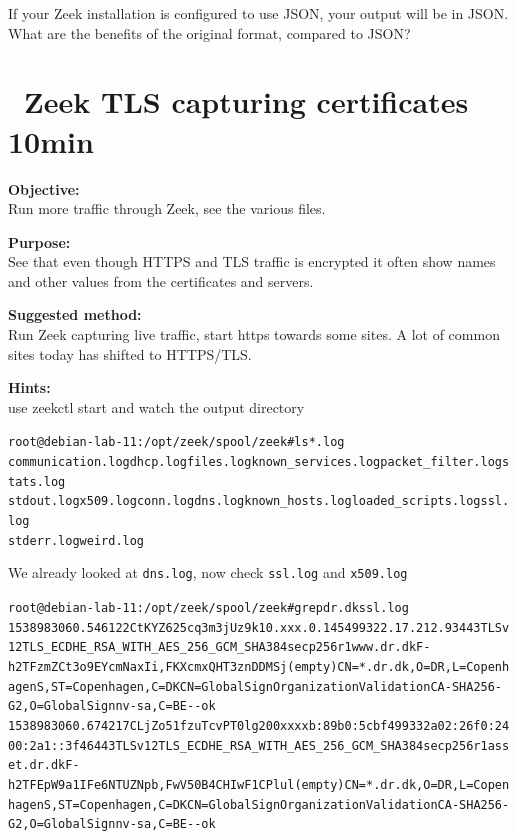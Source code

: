 \documentclass[a4paper,11pt,notitlepage]{report}
\begin{document}
If your Zeek installation is configured to use JSON, your output will be in JSON. What are the benefits of the original format, compared to JSON?

\chapter{\faExclamationTriangle\ Zeek TLS capturing certificates 10min}
\label{ex:zeektlsbasic}


{\bf Objective:} \\
Run more traffic through Zeek, see the various files.


{\bf Purpose:}\\
See that even though HTTPS and TLS traffic is encrypted it often show names and other values from the certificates and servers.


{\bf Suggested method:}\\
Run Zeek capturing live traffic, start https towards some sites. A lot of common sites today has shifted to HTTPS/TLS.


{\bf Hints:}\\
use zeekctl start and watch the output directory

\begin{alltt}\small
root@debian-lab-11:/opt/zeek/spool/zeek# ls *.log
communication.log  dhcp.log files.log known_services.log packet_filter.log  stats.log
stdout.log x509.log conn.log dns.log known_hosts.log loaded_scripts.log  ssl.log
stderr.log weird.log
\end{alltt}

We already looked at \verb+dns.log+, now check \verb+ssl.log+ and \verb+x509.log+

\begin{alltt}\small
root@debian-lab-11:/opt/zeek/spool/zeek# grep dr.dk ssl.log
1538983060.546122	CtKYZ625cq3m3jUz9k	10.xxx.0.145	49932	2.17.212.93	443	TLSv12	TLS_ECDHE_RSA_WITH_AES_256_GCM_SHA384	secp256r1	www.dr.dk	F	-	h2	T	FzmZCt3o9EYcmNaxIi,FKXcmxQHT3znDDMSj	(empty)	CN=*.dr.dk,O=DR,L=Copenhagen S,ST=Copenhagen,C=DK	CN=GlobalSign Organization Validation CA - SHA256 - G2,O=GlobalSign nv-sa,C=BE	-	-	ok
1538983060.674217	CLjZo51fzuTcvPT0lg	200xxxxb:89b0:5cbf	49933	2a02:26f0:2400:2a1::3f46	443	TLSv12	TLS_ECDHE_RSA_WITH_AES_256_GCM_SHA384	secp256r1	asset.dr.dk	F	-	h2	TFEpW9a1IFe6NTUZNpb,FwV50B4CHIwF1CPlul	(empty)	CN=*.dr.dk,O=DR,L=Copenhagen S,ST=Copenhagen,C=DK	CN=GlobalSign Organization Validation CA - SHA256 - G2,O=GlobalSign nv-sa,C=BE	-	-	ok
\end{alltt}
\end{document}
